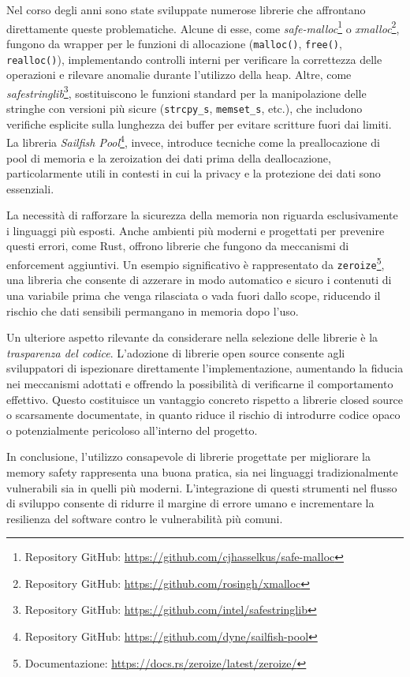 Nel corso degli anni sono state sviluppate numerose librerie che affrontano
direttamente queste problematiche. Alcune di esse, come \textit{safe-malloc}\protect\footnote{Repository
GitHub: \url{https://github.com/cjhasselkus/safe-malloc}} o \textit{xmalloc}\protect\footnote{Repository
GitHub: \url{https://github.com/rosingh/xmalloc}}, fungono da wrapper per le funzioni
di allocazione (\texttt{malloc()}, \texttt{free()}, \texttt{realloc()}), implementando
controlli interni per verificare la correttezza delle operazioni e rilevare anomalie
durante l'utilizzo della heap. Altre, come \textit{safestringlib}\protect\footnote{Repository
GitHub: \url{https://github.com/intel/safestringlib}}, sostituiscono le funzioni
standard per la manipolazione delle stringhe con versioni più sicure (\texttt{strcpy\_s},
\texttt{memset\_s}, etc.), che includono verifiche esplicite sulla lunghezza dei
buffer per evitare scritture fuori dai limiti. La libreria \textit{Sailfish Pool}\protect\footnote{Repository
GitHub: \url{https://github.com/dyne/sailfish-pool}}, invece, introduce tecniche
come la preallocazione di pool di memoria e la zeroization dei dati prima della deallocazione,
particolarmente utili in contesti in cui la privacy e la protezione dei dati
sono essenziali.

La necessità di rafforzare la sicurezza della memoria non riguarda
esclusivamente i linguaggi più esposti. Anche ambienti più moderni e progettati per
prevenire questi errori, come Rust, offrono librerie che fungono da meccanismi di
enforcement aggiuntivi. Un esempio significativo è rappresentato da \texttt{zeroize}\protect\footnote{Documentazione:
\url{https://docs.rs/zeroize/latest/zeroize/}}, una libreria che consente di
azzerare in modo automatico e sicuro i contenuti di una variabile prima che
venga rilasciata o vada fuori dallo scope, riducendo il rischio che dati sensibili
permangano in memoria dopo l'uso.

Un ulteriore aspetto rilevante da considerare nella selezione delle librerie è la
\textit{trasparenza del codice}. L'adozione di librerie open source consente agli
sviluppatori di ispezionare direttamente l'implementazione, aumentando la
fiducia nei meccanismi adottati e offrendo la possibilità di verificarne il
comportamento effettivo. Questo costituisce un vantaggio concreto rispetto a librerie
closed source o scarsamente documentate, in quanto riduce il rischio di
introdurre codice opaco o potenzialmente pericoloso all'interno del progetto.

In conclusione, l'utilizzo consapevole di librerie progettate per migliorare la memory
safety rappresenta una buona pratica, sia nei linguaggi tradizionalmente
vulnerabili sia in quelli più moderni. L'integrazione di questi strumenti nel flusso
di sviluppo consente di ridurre il margine di errore umano e incrementare la resilienza
del software contro le vulnerabilità più comuni.


